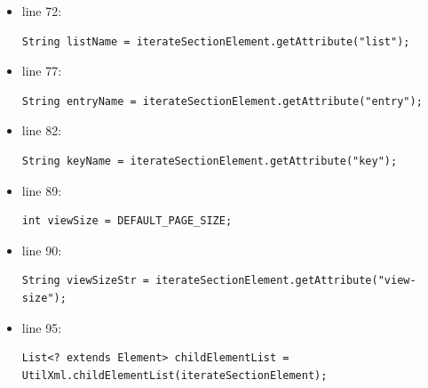 \documentclass{article}
\begin{document}
\begin{flushleft}
\begin{itemize}
\item line 72: \\
\vspace{0.5cm}
\begin{lstlisting}
String listName = iterateSectionElement.getAttribute("list");
\end{lstlisting}
\vspace{0.5cm}
\item line 77: \\
\vspace{0.5cm}
\begin{lstlisting}
String entryName = iterateSectionElement.getAttribute("entry");
\end{lstlisting}
\vspace{0.5cm}
\item line 82: \\
\vspace{0.5cm}
\begin{lstlisting}
String keyName = iterateSectionElement.getAttribute("key"); 
\end{lstlisting}
\vspace{0.5cm}
\item line 89: \\
\vspace{0.5cm}
\begin{lstlisting}
int viewSize = DEFAULT_PAGE_SIZE;
\end{lstlisting}
\vspace{0.5cm}
\item line 90: \\
\vspace{0.5cm}
\begin{lstlisting}
String viewSizeStr = iterateSectionElement.getAttribute("view-size");
\end{lstlisting}
\vspace{0.5cm}
\item line 95: \\
\vspace{0.5cm}
\begin{lstlisting}
List<? extends Element> childElementList = 
UtilXml.childElementList(iterateSectionElement);
\end{lstlisting}
\end{itemize}
\vspace{0.5cm}



\end{flushleft}
\end{document}
